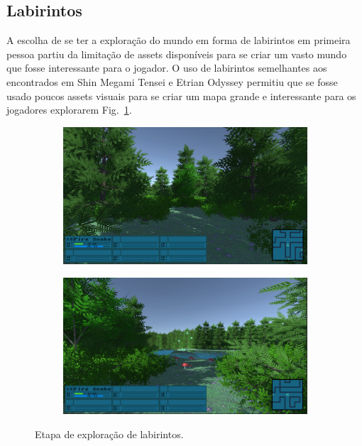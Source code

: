 \subsection{Labirintos}

A escolha de se ter a exploração do mundo em forma de labirintos em primeira pessoa partiu da limitação de assets disponíveis para se criar um vasto mundo que fosse interessante para o jogador. O uso de labirintos semelhantes aos encontrados em Shin Megami Tensei e Etrian Odyssey permitiu que se fosse usado poucos assets visuais para se criar um mapa grande e interessante para os jogadores explorarem Fig.~\ref{fig:jogo1}.

\begin{figure}[h!]
  \centering
  \begin{subfigure}[b]{0.4\linewidth}
    \includegraphics[width=\linewidth]{lab1.jpg}
  \end{subfigure}
  \begin{subfigure}[b]{0.4\linewidth}
    \includegraphics[width=\linewidth]{lab2.jpg}
  \end{subfigure}
  \caption{Etapa de exploração de labirintos.}
  \label{fig:jogo1}
\end{figure}

